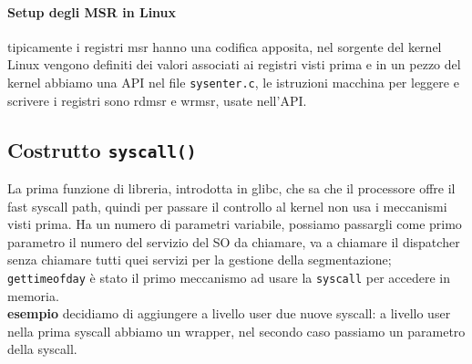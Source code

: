 \documentclass[12pt, oneside]{extbook}
\begin{document}
\paragraph{Setup degli MSR in Linux}tipicamente i registri msr hanno una codifica apposita, nel sorgente del kernel Linux vengono definiti dei valori associati ai registri visti prima e in un pezzo del kernel abbiamo una API nel file \texttt{sysenter.c}, le istruzioni macchina per leggere e scrivere i registri sono rdmsr e wrmsr, usate nell'API.
\subsection{Costrutto \texttt{syscall()}}
La prima funzione di libreria, introdotta in glibc, che sa che il processore offre il fast syscall path, quindi per passare il controllo al kernel non usa i meccanismi visti prima. Ha un numero di parametri variabile, possiamo passargli come primo parametro il numero del servizio del SO da chiamare, va a chiamare il dispatcher senza chiamare tutti quei servizi per la gestione della segmentazione; \texttt{gettimeofday} è stato il primo meccanismo ad usare la \texttt{syscall} per accedere in memoria.\\ 
\textbf{esempio} decidiamo di aggiungere a livello user due nuove syscall: a livello user nella prima syscall abbiamo un wrapper, nel secondo caso passiamo un parametro della syscall.
\end{document}

